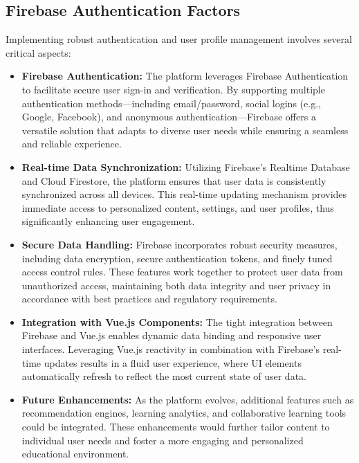 \subsection{Firebase Authentication Factors}

Implementing robust authentication and user profile management involves several critical aspects:

\begin{itemize}
    \item \textbf{Firebase Authentication:} The platform leverages Firebase Authentication to facilitate secure user sign-in and verification. By supporting multiple authentication methods—including email/password, social logins (e.g., Google, Facebook), and anonymous authentication—Firebase offers a versatile solution that adapts to diverse user needs while ensuring a seamless and reliable experience.
    
    \item \textbf{Real-time Data Synchronization:} Utilizing Firebase’s Realtime Database and Cloud Firestore, the platform ensures that user data is consistently synchronized across all devices. This real-time updating mechanism provides immediate access to personalized content, settings, and user profiles, thus significantly enhancing user engagement.
    
    \item \textbf{Secure Data Handling:} Firebase incorporates robust security measures, including data encryption, secure authentication tokens, and finely tuned access control rules. These features work together to protect user data from unauthorized access, maintaining both data integrity and user privacy in accordance with best practices and regulatory requirements.
    
    \item \textbf{Integration with Vue.js Components:} The tight integration between Firebase and Vue.js enables dynamic data binding and responsive user interfaces. Leveraging Vue.js reactivity in combination with Firebase’s real-time updates results in a fluid user experience, where UI elements automatically refresh to reflect the most current state of user data.
    
    \item \textbf{Future Enhancements:} As the platform evolves, additional features such as recommendation engines, learning analytics, and collaborative learning tools could be integrated. These enhancements would further tailor content to individual user needs and foster a more engaging and personalized educational environment.
\end{itemize}

